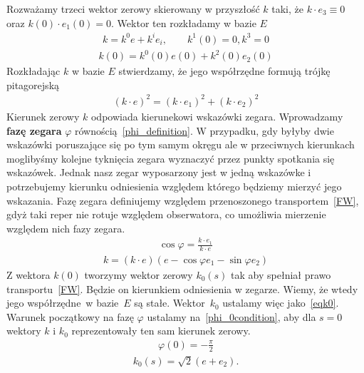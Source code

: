 Rozważamy trzeci wektor zerowy skierowany w przyszłość $k$ taki, 
że $k\cdot e_3 \equiv 0$ oraz $k(0)\cdot e_1(0) =0$.  
Wektor ten rozkładamy w bazie $E$
\begin{align*}
k = k^0 e +  k^i e_i, \qquad k^1(0)=0, k^3 = 0
\end{align*}
\begin{align*}
k(0) = k^0(0) e(0) + k^2(0) e_2(0) 
\end{align*}
Rozkładając $k$ w bazie $E$ stwierdzamy, że jego współrzędne 
formują trójkę pitagorejską 
\begin{align}
(k \cdot e)^2 = (k \cdot e_1)^2 +  (k \cdot e_2)^2
\end{align}
Kierunek zerowy $k$ odpowiada kierunekowi wskazówki zegara. 
Wprowadzamy \textbf{fazę zegara} $\varphi$ 
równością~\eqref{phi_definition}. W przypadku, gdy byłyby 
dwie wskazówki poruszające się po tym samym okręgu ale w 
przeciwnych kierunkach moglibyśmy kolejne tyknięcia zegara
wyznaczyć przez punkty spotkania się wskazówek. 
Jednak nasz zegar wyposarzony jest w jedną wskazówke i 
potrzebujemy kierunku odniesienia względem którego będziemy 
mierzyć jego wskazania. Fazę zegara definiujemy względem 
przenoszonego transportem~\eqref{FW}, gdyż taki reper nie 
rotuje względem obserwatora, co umożliwia mierzenie względem 
nich fazy zegara.
\begin{align}\label{phi_definition}
\cos\varphi = \frac{k\cdot e_1}{k\cdot e} 
\end{align}
\begin{align*}
k = (k\cdot e) (e -\cos\varphi e_1 - \sin\varphi e_2 )
\end{align*}
Z wektora $k(0)$ tworzymy wektor zerowy $k_0(s)$ tak aby spełniał 
prawo transportu~\eqref{FW}. Będzie on kierunkiem odniesienia 
w zegarze. Wiemy, że wtedy jego współrzędne~w 
bazie~$E$ są stałe. Wektor~$k_0$ ustalamy więc jako~\eqref{eqk0}.
Warunek początkowy na fazę $\varphi$ ustalamy 
na~\eqref{phi_0condition}, aby dla $s=0$ wektory
$k$ i $k_0$ reprezentowały ten sam kierunek zerowy. 
\begin{align}\label{phi_0condition}
\varphi(0)=-\frac{\pi}{2}
\end{align}
\begin{align}\label{eqk0}
k_0(s) =  \sqrt{2} (e + e_2).
\end{align}
